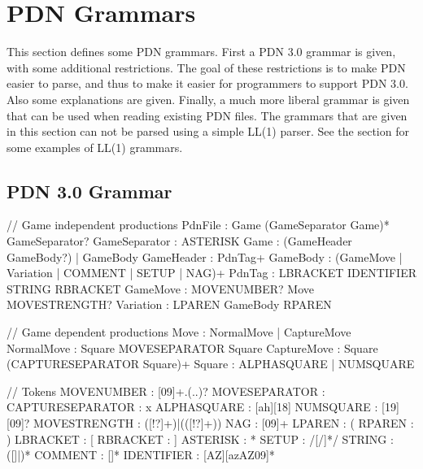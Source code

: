 \documentclass[letterpaper,10pt,english]{sphinxmanual}
\begin{document}
\chapter{PDN Grammars}
\label{\detokenize{grammar:pdn-grammars}}\label{\detokenize{grammar:grammar-section}}\label{\detokenize{grammar::doc}}
\sphinxAtStartPar
This section defines some PDN grammars. First a PDN 3.0 grammar is given, with some
additional restrictions. The goal of these restrictions is to make PDN easier to parse,
and thus to make it easier for programmers to support PDN 3.0.
Also some explanations are given. Finally, a much more liberal  grammar is
given that can be used when reading existing PDN files.
The grammars that are given in this section can not be parsed using a simple LL(1)
parser. See the {\hyperref[\detokenize{implementation:implementation-section}]{}} section for some examples of LL(1)
grammars.


\section{PDN 3.0 Grammar}
\label{\detokenize{grammar:pdn-3-0-grammar}}
\begin{sphinxVerbatim}[commandchars=\\\{\}]
// Game independent productions
PdnFile          : Game (GameSeparator Game)* GameSeparator?
GameSeparator    : ASTERISK
Game             : (GameHeader GameBody?) | GameBody
GameHeader       : PdnTag+
GameBody         : (GameMove | Variation | COMMENT | SETUP | NAG)+
PdnTag           : LBRACKET IDENTIFIER STRING RBRACKET
GameMove         : MOVENUMBER? Move MOVESTRENGTH?
Variation        : LPAREN GameBody RPAREN

// Game dependent productions
Move             : NormalMove | CaptureMove
NormalMove       : Square MOVESEPARATOR Square
CaptureMove      : Square (CAPTURESEPARATOR Square)+
Square           : ALPHASQUARE | NUMSQUARE

// Tokens
MOVENUMBER       : \PYGZdq{}[0\PYGZhy{}9]+\PYGZbs{}.(\PYGZbs{}.\PYGZbs{}.)?\PYGZdq{}
MOVESEPARATOR    : \PYGZdq{}\PYGZhy{}\PYGZdq{}
CAPTURESEPARATOR : \PYGZdq{}x\PYGZdq{}
ALPHASQUARE      : \PYGZdq{}[a\PYGZhy{}h][1\PYGZhy{}8]\PYGZdq{}
NUMSQUARE        : \PYGZdq{}[1\PYGZhy{}9][0\PYGZhy{}9]?\PYGZdq{}
MOVESTRENGTH     : \PYGZdq{}([\PYGZbs{}!\PYGZbs{}?]+)|(\PYGZbs{}([\PYGZbs{}!\PYGZbs{}?]+\PYGZbs{}))\PYGZdq{}
NAG              : \PYGZdq{}\PYGZbs{}\PYGZdl{}[0\PYGZhy{}9]+\PYGZdq{}
LPAREN           : \PYGZdq{}\PYGZbs{}(\PYGZdq{}
RPAREN           : \PYGZdq{}\PYGZbs{})\PYGZdq{}
LBRACKET         : \PYGZdq{}\PYGZbs{}[\PYGZdq{}
RBRACKET         : \PYGZdq{}\PYGZbs{}]\PYGZdq{}
ASTERISK         : \PYGZdq{}\PYGZbs{}*\PYGZdq{}
SETUP            : \PYGZdq{}\PYGZbs{}/[\PYGZca{}\PYGZbs{}/]*\PYGZbs{}/\PYGZdq{}
STRING           : \PYGZdq{}\PYGZbs{}\PYGZdq{}([\PYGZca{}\PYGZbs{}\PYGZdq{}]|\PYGZbs{}\PYGZbs{}\PYGZbs{}\PYGZdq{})*\PYGZbs{}\PYGZdq{}\PYGZdq{}
COMMENT          : \PYGZdq{}\PYGZbs{}\PYGZob{}[\PYGZca{}\PYGZcb{}]*\PYGZbs{}\PYGZcb{}\PYGZdq{}
IDENTIFIER       : \PYGZdq{}[A\PYGZhy{}Z][a\PYGZhy{}zA\PYGZhy{}Z0\PYGZhy{}9\PYGZus{}]*\PYGZdq{}
\end{sphinxVerbatim}
\end{document}
